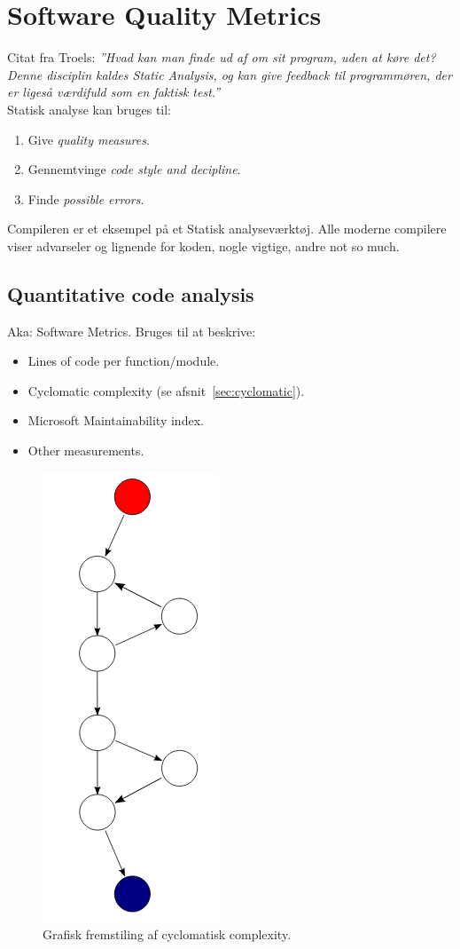 \section{Software Quality Metrics}
Citat fra Troels: \textit{''Hvad kan man finde ud af om sit program, uden at køre det? Denne disciplin kaldes Static Analysis, og kan give feedback til programmøren, der er ligeså værdifuld som en faktisk test.''}\\

Statisk analyse kan bruges til: 

\begin{enumerate}
	\item Give \textit{quality measures}.
	\item Gennemtvinge \textit{code style and decipline}.
	\item Finde \textit{possible errors}.
\end{enumerate}

Compileren er et eksempel på et Statisk analyseværktøj. Alle moderne compilere viser advarseler og lignende for koden, nogle vigtige, andre not so much.

\subsection{Quantitative code analysis}
Aka: Software Metrics. Bruges til at beskrive: 

\begin{itemize}
	\item Lines of code per function/module.
	\item Cyclomatic complexity (se afsnit~\ref{sec:cyclomatic}).
	\item Microsoft Maintainability index.
	\item Other measurements.
\end{itemize}

\begin{figure}[H]
\centering
\includegraphics[width=0.25\linewidth]{figs/cyclomatic}
\caption{Grafisk fremstiling af cyclomatisk complexity.}
\label{fig:cyclomatic}
\end{figure}
